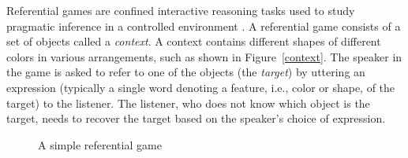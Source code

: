 Referential games are confined interactive reasoning tasks used to
study pragmatic inference in a controlled environment \cite{Frank}. A
referential game consists of a set of objects called a
\textit{context}. A context contains different shapes of different
colors in various arrangements, such as shown in Figure~\ref{context}.
The speaker in the game is asked to refer to one of the objects (the
\emph{target}) by uttering an expression (typically a single word
denoting a feature, i.e., color or shape, of the target) to the
listener. The listener, who does not know which object is the
target, needs to recover the target based on the speaker's choice of
expression.

\begin{figure}[h] 
  \centering {}\hspace{5mm} 
  \caption{A simple referential game}
\end{figure}


